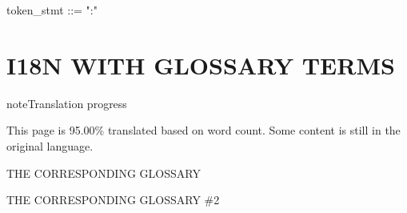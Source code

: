 \documentclass[letterpaper,10pt,english]{sphinxmanual}
\begin{document}
\begin{fulllineitems}
\label{\detokenize{role_xref:cmdoption-module}}
\pysigstartsignatures
\pysigline
{}
\pysigstopsignatures
\end{fulllineitems}


\begin{fulllineitems}
\label{\detokenize{role_xref:envvar-env1}}
\pysigstartsignatures
\pysigline
{}
\pysigstopsignatures
\end{fulllineitems}


\begin{fulllineitems}
\label{\detokenize{role_xref:envvar-env2}}
\pysigstartsignatures
\pysigline
{}
\pysigstopsignatures
\end{fulllineitems}



\begin{productionlist}
\label{\detokenize{role_xref:grammar-token-token_stmt}}token\_stmt ::=  ":" 
\end{productionlist}


\sphinxstepscope


\chapter{I18N WITH GLOSSARY TERMS}
\label{\detokenize{glossary_terms:i18n-with-glossary-terms}}\label{\detokenize{glossary_terms::doc}}
\begin{sphinxadmonition}{note}{Translation progress}

\sphinxAtStartPar
This page is 95.00\% translated based on word count. Some content is still in the original language.
\end{sphinxadmonition}
\begin{description}
\sphinxAtStartPar
THE CORRESPONDING GLOSSARY

\sphinxAtStartPar
THE CORRESPONDING GLOSSARY \#2

\end{description}
\end{document}
